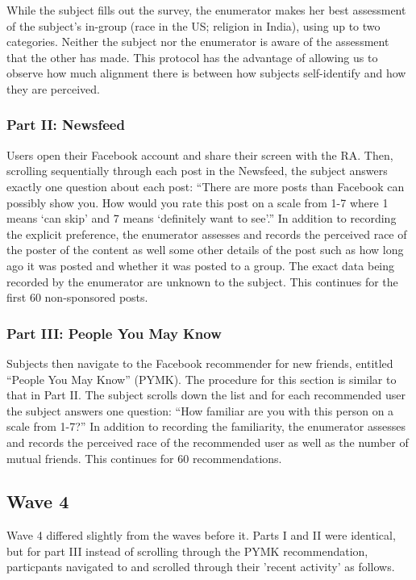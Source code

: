 \documentclass[12pt,letterpaper]{article}
\begin{document}
While the subject fills out the survey, the enumerator makes her best assessment of the subject’s in-group (race in the US; religion in India), using up to two categories. Neither the subject nor the enumerator is aware of the assessment that the other has made. This protocol has the advantage of allowing us to observe how much alignment there is between how subjects self-identify and how they are perceived.

\subsubsection{Part II: Newsfeed} Users open their Facebook account and share their screen with the RA. Then, scrolling sequentially through each post in the Newsfeed, the subject answers exactly one question about each post: “There are more posts than Facebook can possibly show you. How would you rate this post on a scale from 1-7 where 1 means ‘can skip’ and 7 means ‘definitely want to see’.” In addition to recording the explicit preference, the enumerator assesses and records the perceived race of the poster of the content as well some other details of the post such as how long ago it was posted and whether it was posted to a group. The exact data being recorded by the enumerator are unknown to the subject. This continues for the first 60 non-sponsored posts.

\subsubsection{Part III: People You May Know} Subjects then navigate to the Facebook recommender for new friends, entitled “People You May Know” (PYMK). The procedure for this section is similar to that in Part II. The subject scrolls down the list and for each recommended user the subject answers one question: “How familiar are you with this person on a scale from 1-7?” In addition to recording the familiarity, the enumerator assesses and records the perceived race of the recommended user as well as the number of mutual friends. This continues for 60 recommendations.

\subsection{Wave 4}

Wave 4 differed slightly from the waves before it. Parts I and II were identical, but for part III instead of scrolling through the PYMK recommendation, particpants navigated to and scrolled through their 'recent activity' as follows.
\end{document}
